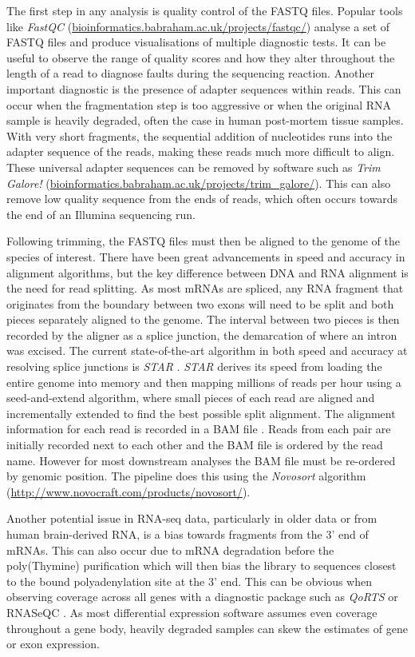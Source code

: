 The first step in any analysis is quality control of the FASTQ files. 
Popular tools like \textit{FastQC} (\url{bioinformatics.babraham.ac.uk/projects/fastqc/}) analyse a set of FASTQ files and produce visualisations of multiple diagnostic tests. 
It can be useful to observe the range of quality scores and how they alter throughout the length of a read to diagnose faults during the sequencing reaction. 
Another important diagnostic is the presence of adapter sequences within reads. 
This can occur when the fragmentation step is too aggressive or when the original RNA sample is heavily degraded, often the case in human post-mortem tissue samples. 
With very short fragments, the sequential addition of nucleotides runs into the adapter sequence of the reads, making these reads much more difficult to align. 
These universal adapter sequences can be removed by software such as \textit{Trim Galore!} (\url{bioinformatics.babraham.ac.uk/projects/trim_galore/}).
This can also remove low quality sequence from the ends of reads, which often occurs towards the end of an Illumina sequencing run. 

Following trimming, the FASTQ files must then be aligned to the genome of the species of interest. 
There have been great advancements in speed and accuracy in alignment algorithms, but the key difference between DNA and RNA alignment is the need for read splitting. 
As most mRNAs are spliced, any RNA fragment that originates from the boundary between two exons will need to be split and both pieces separately aligned to the genome. 
The interval between two pieces is then recorded by the aligner as a splice junction, the demarcation of where an intron was excised. 
The current state-of-the-art algorithm in both speed and accuracy at resolving splice junctions is \textit{STAR} \citep{Dobin2013-ra}.
\textit{STAR} derives its speed from loading the entire genome into memory and then mapping millions of reads per hour using a seed-and-extend algorithm, where small pieces of each read are aligned and incrementally extended to find the best possible split alignment. 
The alignment information for each read is recorded in a BAM file \citep{Li2009-hm}. 
Reads from each pair are initially recorded next to each other and the BAM file is ordered by the read name. 
However for most downstream analyses the BAM file must be re-ordered by genomic position. 
The pipeline does this using the \textit{Novosort} algorithm (\url{http://www.novocraft.com/products/novosort/}). 

Another potential issue in RNA-seq data, particularly in older data or from human brain-derived RNA, is a bias towards fragments from the 3' end of mRNAs. 
This can also occur due to mRNA degradation before the poly(Thymine) purification which will then bias the library to sequences closest to the bound polyadenylation site at the 3' end. 
This can be obvious when observing coverage across all genes with a diagnostic package such as \textit{QoRTS} or RNASeQC \citep{Hartley2015a, Deluca2012}. 
As most differential expression software assumes even coverage throughout a gene body, heavily degraded samples can skew the estimates of gene or exon expression.

